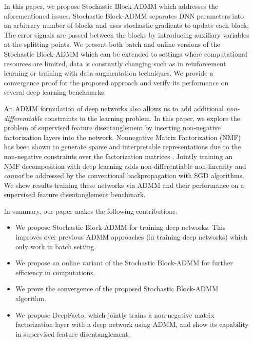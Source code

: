 In this paper, we propose Stochastic Block-ADMM which addresses the aforementioned issues. Stochastic Block-ADMM separates DNN parameters into an arbitrary number of blocks and uses stochastic gradients to update each block. The error signals are passed between the blocks by introducing auxiliary variables at the splitting points. We present both batch and online versions of the Stochastic Block-ADMM which can be extended to settings where computational resources are limited, data is constantly changing such as in reinforcement learning or training with data augmentation techniques. We provide a convergence proof for the proposed approach and verify its performance on several deep learning benchmarks.


An ADMM formulation of deep networks also allows us to add additional \textit{non-differentiable} constraints to the learning problem. In this paper, %
we explore the problem of supervised feature disentanglement by inserting non-negative factorization layers into the network. Nonnegative Matrix Factorization (NMF) has been shown to generate sparse and interpretable representations due to the non-negative constraints over the factorization matrices \cite{lee1999learning}. Jointly training an NMF decomposition with deep learning adds non-differentiable non-linearity and \textit{cannot} be addressed by the conventional backpropagation with SGD algorithms. We show results training these networks via ADMM and their performance on a supervised feature disentanglement benchmark.


In summary, our paper makes the following contributions:
\begin{itemize}
    \item We propose Stochastic Block-ADMM for training deep networks. This improves over previous ADMM approaches (in training deep networks) which only work in batch setting.
    \item We propose an online variant of the Stochastic Block-ADMM for further efficiency in computations. 
    \item We prove the convergence of the proposed Stochastic Block-ADMM algorithm.
    \item We propose DeepFacto, which jointly trains a non-negative matrix factorization layer with a deep network using ADMM, and show its capability in supervised feature disentanglement.
\end{itemize}


